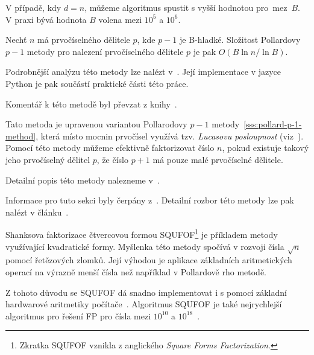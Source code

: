\documentclass[
  program=infoi,
  biblatex=false,
  figures=true,
  glossaries,
  tables=false,
  sourcecodes=true,
  index
]{kidiplom}
\begin{document}
            \begin{remark}
                V případě, kdy $d = n$, můžeme algoritmus spustit s vyšší hodnotou pro~mez~$B$.
                V praxi bývá hodnota $B$ volena mezi $10^5$ a $10^6$.
            \end{remark}

            \begin{theorem}
                Nechť $n$ má prvočíselného dělitele $p$, kde $p-1$ je B-hladké.
                Složitost Pollardovy $p-1$ metody pro nalezení prvočíselného dělitele $p$ je pak $O(B \ln{n}/\ln{B})$.
            \end{theorem}

            Podrobnější analýzu této metody lze nalézt v~\cite{primes-and-factorization}.
            Její implementace v jazyce Python je pak součástí praktické části této práce.


        \label{sss:p-plus-1-method}

            Komentář k této metodě byl převzat z knihy~\cite{primes-and-factorization}.

            Tato metoda je upravenou variantou Pollarodovy $p-1$ metody~\ref{sss:pollard-p-1-method}, která
            místo mocnin prvočísel využívá tzv. \emph{Lucasovu posloupnost} (viz~\cite{method-p+1}).
            Pomocí této metody můžeme efektivně faktorizovat číslo $n$, pokud existuje takový jeho prvočíselný dělitel $p$, že
            číslo $p+1$ má pouze malé prvočíselné dělitele.

            Detailní popis této metody nalezneme v~\cite{method-p+1}.


        \label{sss:SQUFOF}

            Informace pro tuto sekci byly čerpány z~\cite{primes-and-factorization}.
            Detailní rozbor této metody lze pak nalézt v článku~\cite{squfof-implementation}.  

            Shanksova faktorizace čtvercovou formou SQUFOF\footnote{Zkratka
            SQUFOF vznikla z anglického \emph{Square Forms Factorization}.} 
            je příkladem metody využívající kvadratické formy.
            Myšlenka této metody spočívá v rozvoji čísla $\sqrt{n}$ pomocí řetězových zlomků.
            Její výhodou je aplikace základních aritmetických operací na výrazně menší čísla než
            například v Pollardově rho metodě.

            Z tohoto důvodu se SQUFOF dá snadno implementovat i s pomocí základní hardwarové aritmetiky
            počítače~\cite{primes-and-factorization}.
            Algoritmus SQUFOF je také nejrychlejší algoritmus pro řešení FP pro
            čísla mezi $10^{10}$ a $10^{18}$~\cite{squfof-implementation}.
\end{document}
